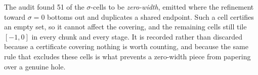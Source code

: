 \documentclass[11pt]{article}
\begin{document}
\begin{remark}
The audit found 51 of the $\sigma$-cells to be
\emph{zero-width}, emitted where the refinement toward $\sigma = 0$ bottoms out
and duplicates a shared endpoint. Such a cell certifies an empty set, so it
cannot affect the covering, and the remaining cells still tile $[-1,0]$ in every
chunk and every stage. It is recorded rather than discarded because a
certificate covering nothing is worth counting, and because the same rule that
excludes these cells is what prevents a zero-width piece from papering over a
genuine hole.
\end{remark}
\end{document}
